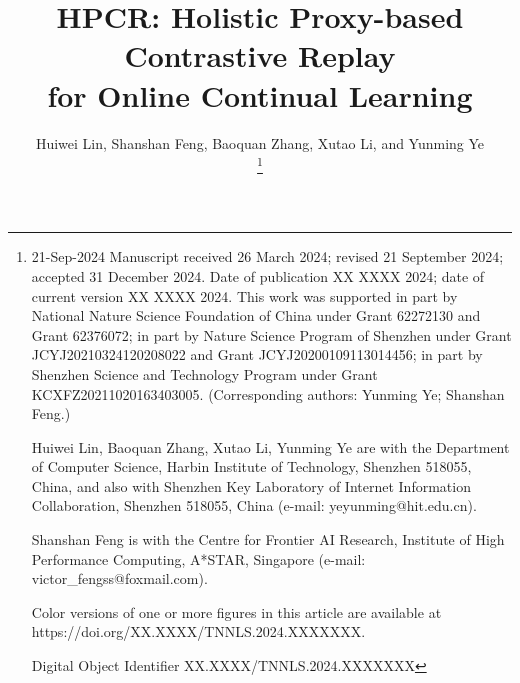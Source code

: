\documentclass[lettersize,journal]{IEEEtran}
\begin{document}
\title{HPCR: Holistic Proxy-based Contrastive Replay\\for Online Continual Learning}

\author{Huiwei Lin, Shanshan Feng, Baoquan Zhang, Xutao Li, and Yunming Ye

\thanks{21-Sep-2024
    Manuscript received 26 March 2024; revised 21 September 2024; accepted 31 December 2024. Date of publication XX XXXX 2024; date of current version XX XXXX 2024. This work was supported in part by National Nature Science Foundation of China under Grant 62272130 and Grant 62376072; in part by Nature Science Program of Shenzhen under Grant JCYJ20210324120208022 and Grant JCYJ20200109113014456; in part by Shenzhen Science and Technology Program under Grant KCXFZ20211020163403005. (Corresponding authors: Yunming Ye; Shanshan Feng.)

    Huiwei Lin, Baoquan Zhang, Xutao Li, Yunming Ye are with the Department of Computer Science, Harbin Institute of Technology, Shenzhen 518055, China, and also with Shenzhen Key Laboratory of Internet Information Collaboration, Shenzhen 518055, China (e-mail: yeyunming@hit.edu.cn).

    Shanshan Feng is with the Centre for Frontier AI Research, Institute of High Performance Computing, A*STAR, Singapore (e-mail: victor\_fengss@foxmail.com).
 
 Color versions of one or more figures in this article are available at https://doi.org/XX.XXXX/TNNLS.2024.XXXXXXX.

 Digital Object Identifier XX.XXXX/TNNLS.2024.XXXXXXX
 }
}
 

\end{document}
